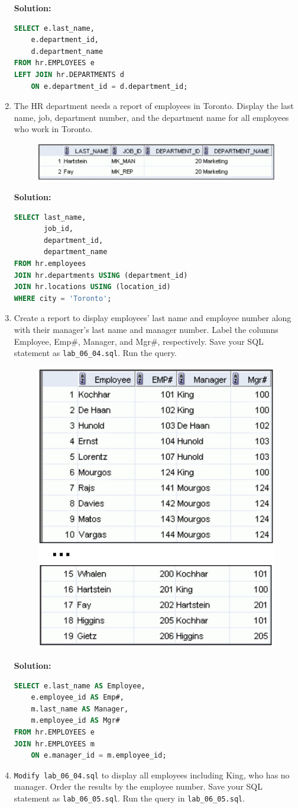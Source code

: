 \documentclass[a4paper,12pt]{article}
\begin{document}
\begin{enumerate}
    \textbf{Solution: }
    \begin{lstlisting}[language=SQL]
SELECT e.last_name, 
    e.department_id, 
    d.department_name
FROM hr.EMPLOYEES e
LEFT JOIN hr.DEPARTMENTS d 
    ON e.department_id = d.department_id;
    \end{lstlisting}
    \item The HR department needs a report of employees in Toronto. Display the last name, job,
department number, and the department name for all employees who work in Toronto.
    \begin{figure}[h]
        \centering
            \centering
            \includegraphics[width=.6\linewidth]{graphics/63.png}
    \end{figure}
    
    \textbf{Solution: }
    \begin{lstlisting}[language=SQL]
SELECT last_name,
       job_id,
       department_id,
       department_name
FROM hr.employees
JOIN hr.departments USING (department_id)
JOIN hr.locations USING (location_id)
WHERE city = 'Toronto';
    \end{lstlisting}
        \item Create a report to display employees' last name and employee number along with their
manager's last name and manager number. Label the columns Employee, Emp\#, Manager,
and Mgr\#, respectively. Save your SQL statement as \texttt{lab\_06\_04.sql}. Run the query.
    \begin{figure}[h]
        \centering
            \centering
            \includegraphics[width=.35\linewidth]{graphics/64.png}
    \end{figure}
    
     \textbf{Solution: }
    \begin{lstlisting}[language=SQL]
SELECT e.last_name AS Employee, 
    e.employee_id AS Emp#, 
    m.last_name AS Manager, 
    m.employee_id AS Mgr#
FROM hr.EMPLOYEES e
JOIN hr.EMPLOYEES m 
    ON e.manager_id = m.employee_id;
    \end{lstlisting}
    \newpage
        \item \texttt{Modify\ lab\_06\_04.sql} to display all employees including King, who has no manager.
Order the results by the employee number. Save your SQL statement as \texttt{lab\_06\_05.sql}.
Run the query in \texttt{lab\_06\_05.sql}.
    

\end{enumerate}
\end{document}
